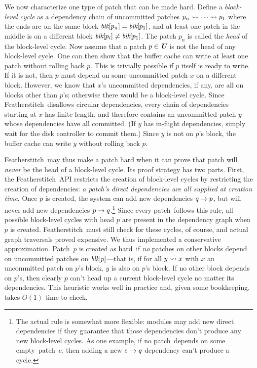 \documentclass[9pt,twocolumn,letterpaper]{article}
\newcommand{\Kudos}{Featherstitch}
\newcommand{\Featherstitch}{\Kudos}
\newcommand{\patch}{patch}
\newcommand{\Patch}{Patch}
\newcommand{\noop}{empty}
\newcommand{\nrb}{hard}
\begin{document}
We now characterize one type of patch that can be made hard.
%
Define a \emph{block-level cycle} as a dependency chain of uncommitted
 patches $p_n \leadsto \cdots \leadsto p_1$ where the ends are on the same
 block $\textit{blk}[{p_n}] = \textit{blk}[{p_1}]$, and at least one patch in the middle
 is on a different block $\textit{blk}[{p_i}] \neq \textit{blk}[{p_1}]$.
%
The patch $p_n$ is called the \emph{head} of the block-level cycle.
%
Now assume that a patch $p \in \PMem$ is not the head of any block-level
 cycle.
%
One can then show that the buffer cache can write at least one patch
 without rolling back $p$.
%
This is trivially possible if $p$ itself is ready to write.
%
If it is not, then $p$ must depend on some uncommitted patch $x$ on a different
 block.
%
However, we know that $x$'s uncommitted dependencies, if any, are all on
 blocks other than $p$'s; otherwise there would be a block-level cycle.
%
Since \Featherstitch\ disallows circular dependencies, every
 chain of dependencies starting at $x$ has finite length, and therefore
 contains an uncommitted patch $y$ whose dependencies have all
 committed.
%
(If $y$ has in-flight dependencies, simply wait
 for the disk controller to commit them.)
%
Since $y$ is not on $p$'s block, the buffer cache can write $y$ without
 rolling back $p$.


\Featherstitch\ may thus make a patch hard when it can prove that patch
 will \emph{never} be the head of a block-level cycle.
%
Its proof strategy has two parts.
%
First, the \Kudos\ API restricts the creation of block-level cycles by
 restricting the creation of dependencies:
%
\emph{a \patch's direct dependencies are all supplied at creation time}.
%
Once $p$ is created, the system can add new dependencies $q \rightarrow p$,
 but will never add new dependencies $p \rightarrow q$.\footnote{The actual
 rule is somewhat more flexible: modules may add new direct dependencies if
 they guarantee that those dependencies don't produce any new block-level
 cycles.  As one example, if no \patch\ depends on some \noop\ \patch\ $e$,
 then adding a new $e \rightarrow q$ dependency can't produce a cycle.}
%
Since every \patch\ follows this rule, all possible block-level cycles with
 head $p$ are present in the dependency graph when $p$ is created.
%
\Featherstitch\ must still check for these cycles, of course, and
%
actual graph traversals proved expensive.
%
We thus implemented a conservative approximation.
%
\Patch\ $p$ is
created as \nrb\ if \emph{no} patches on other blocks depend on uncommitted
 patches on $\textit{blk}[{p}]$---that is, if
%
for all $y \leadsto x$ with $x$ an uncommitted patch on $p$'s block,
 $y$ is also on $p$'s block.
%
If no other block depends on $p$'s, then clearly $p$ can't head up
 a current block-level cycle no matter its dependencies.
%
This heuristic works well in practice and, given some bookkeeping, 
 takes $O(1)$ time to check.
\end{document}
